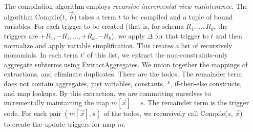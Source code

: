 The compilation algorithm employs {\em recursive incremental view
maintenance}. The algorithm Compile($t$, $\vec{b}$) takes a term $t$ to be
compiled and a tuple of bound variables.
For each trigger to be created (that is, for schema $R_1, \dots, R_k$,
the triggers are $+R_1, -R_1, \dots, +R_k, -R_k$),
we apply $\Delta$ for that trigger to $t$ and then normalize and
apply variable simplification. This creates a list of recursively monomials.
In each term $t'$ of this list, we extract the non-constraints-only aggregate
subterms using ExtractAggregates. We union together the mappings of
extractions, and eliminate duplicates. These are the todos.
The remainder term does not contain aggregates, just variables, constants, *,
if-then-else constructs, and map lookups.
By this extraction, we are committing ourselves to incrementally maintaining
the map $m[\vec{x}] = s$. 
The remainder term is the trigger code. For each pair $(m[\vec{x}], s)$
of the todos, we recursively call Compile($s$, $\vec{x}$) to create the update
triggers for map $m$.

